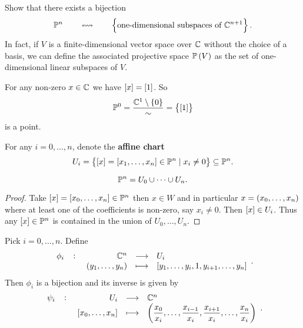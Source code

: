 \begin{exercise}
Show that there exists a bijection
$$ \P^n \qquad \leftrightsquigarrow \qquad \cbr{\text{one-dimensional subspaces of} \ \C^{n + 1}}. $$
In fact, if $ V $ is a finite-dimensional vector space over $ \C $ without the choice of a basis, we can define the associated projective space $ \P\br{V} $ as the set of one-dimensional linear subspaces of $ V $.
\end{exercise}

\begin{example}
For any non-zero $ x \in \C $ we have $ \sbr{x} = \sbr{1} $. So
$$ \P^0 = \dfrac{\C^1 \setminus \cbr{0}}{\sim} = \cbr{\sbr{1}} $$
is a point.
\end{example}

\begin{notation}
For any $ i = 0, \dots, n $, denote the \textbf{affine chart}
$$ U_i = \cbr{\sbr{x} = \sbr{x_1, \dots, x_n} \in \P^n \mid x_i \ne 0} \subseteq \P^n. $$
\end{notation}

\begin{lemma}
\label{lem:3.9}
$$ \P^n = U_0 \cup \dots \cup U_n. $$
\end{lemma}

\begin{proof}
Take $ \sbr{x} = \sbr{x_0, \dots, x_n} \in \P^n $ then $ x \in W $ and in particular $ x = \br{x_0, \dots, x_n} $ where at least one of the coefficients is non-zero, say $ x_i \ne 0 $. Then $ \sbr{x} \in U_i $. Thus any $ \sbr{x} \in \P^n $ is contained in the union of $ U_0, \dots, U_n $.
\end{proof}

\pagebreak

\begin{lemma}
\label{lem:3.10}
Pick $ i = 0, \dots, n $. Define
$$ \function[\phi_i]{\C^n}{U_i}{\br{y_1, \dots, y_n}}{\sbr{y_1, \dots, y_i, 1, y_{i + 1}, \dots, y_n}}. $$
Then $ \phi_i $ is a bijection and its inverse is given by
$$ \function[\psi_i]{U_i}{\C^n}{\sbr{x_0, \dots, x_n}}{\br{\dfrac{x_0}{x_i}, \dots, \dfrac{x_{i - 1}}{x_i}, \dfrac{x_{i + 1}}{x_i}, \dots, \dfrac{x_n}{x_i}}}. $$
\end{lemma}

